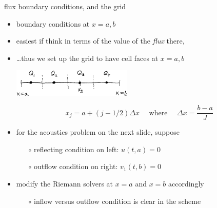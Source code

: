 \documentclass[10pt,dvipsnames,usepdftitle=false,
hyperref={pdftitle = {Finite volume methods},
    pdfauthor = {Ed Bueler}}]{beamer}
\begin{document}
\begin{frame}{flux boundary conditions, and the grid}

\begin{itemize}
\item boundary conditions at $x=a,b$
\item easiest if think in terms of the value of the \emph{flux} there,
\item \dots thus we set up the grid to have cell faces at $x=a,b$

\medskip
\begin{center}
\includegraphics[width=0.45\textwidth]{figs/fluxbdrysketch}
\end{center}

\vspace{-2mm}
    $$x_j = a + (j-1/2) \Delta x \quad \text{ where } \quad \Delta x = \frac{b-a}{J}$$

\item for the acoustics problem on the next slide, suppose
    \begin{itemize}
    \item[$\circ$] reflecting condition on left: $u(t,a)=0$
    \item[$\circ$] outflow condition on right: $v_1(t,b)=0$
    \end{itemize}
\item modify the Riemann solvers at $x=a$ and $x=b$ accordingly
    \begin{itemize}
    \item[$\circ$] inflow versus outflow condition is clear in the scheme
    \end{itemize}
\end{itemize}
\end{frame}
\end{document}
